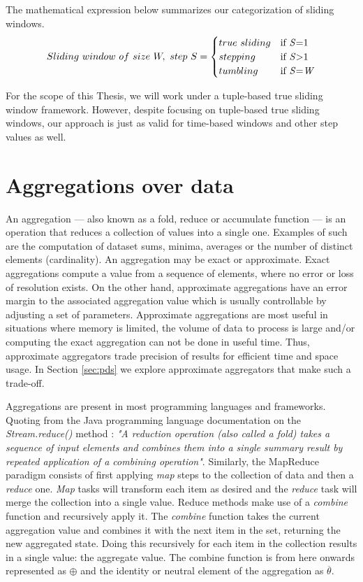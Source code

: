 The mathematical expression below summarizes our categorization of sliding windows.
\begin{equation} 
\label{math:windows}
  Sliding\ window \,\, of \,\, size \,\, W, \,\, step \,\, S =
    \begin{cases}
      true \,\, sliding & \text{if \textit{S}=1}\\
      stepping & \text{if \textit{S}>1}\\
      tumbling & \text{if \textit{S}=\textit{W}}
    \end{cases}
\end{equation}

For the scope of this Thesis, we will work under a tuple-based true sliding window framework. However, despite focusing on tuple-based true sliding windows, our approach is just as valid for time-based windows and other step values as well.

\section{Aggregations over data} \label{sec:aggregations}

An aggregation --- also known as a fold, reduce or accumulate function --- is an operation that reduces a collection of values into a single one. Examples of such are the computation of dataset sums, minima, averages or the number of distinct elements (cardinality). An aggregation may be exact or approximate. Exact aggregations compute a value from a sequence of elements, where no error or loss of resolution exists. On the other hand, approximate aggregations have an error margin to the associated aggregation value which is usually controllable by adjusting a set of parameters. 
Approximate aggregations are most useful in situations where memory is limited, the volume of data to process is large and/or computing the exact aggregation can not be done in useful time. Thus, approximate aggregators trade precision of results for efficient time and space usage. In Section \ref{sec:pds} we explore approximate aggregators that make such a trade-off.

Aggregations are present in most programming languages and frameworks. Quoting from the Java programming language documentation on the \textit{Stream.reduce()} method \cite{Java13StreamReduce}: 
\textit{"A reduction operation (also called a fold) takes a sequence of input elements and combines them into a single summary result by repeated application of a combining operation"}. Similarly, the MapReduce \cite{MapReduce} paradigm consists of first applying \textit{map} steps to the collection of data and then a \textit{reduce} one. \textit{Map} tasks will transform each item as desired and the \textit{reduce} task will merge the collection into a single value. Reduce methods make use of a \textit{combine} function and recursively apply it. The \textit{combine} function takes the current aggregation value and combines it with the next item in the set, returning the new aggregated state. Doing this recursively for each item in the collection results in a single value: the aggregate value. The combine function is from here onwards represented as $\oplus$ and the identity or neutral element of the aggregation as $\overline{\theta}$.

